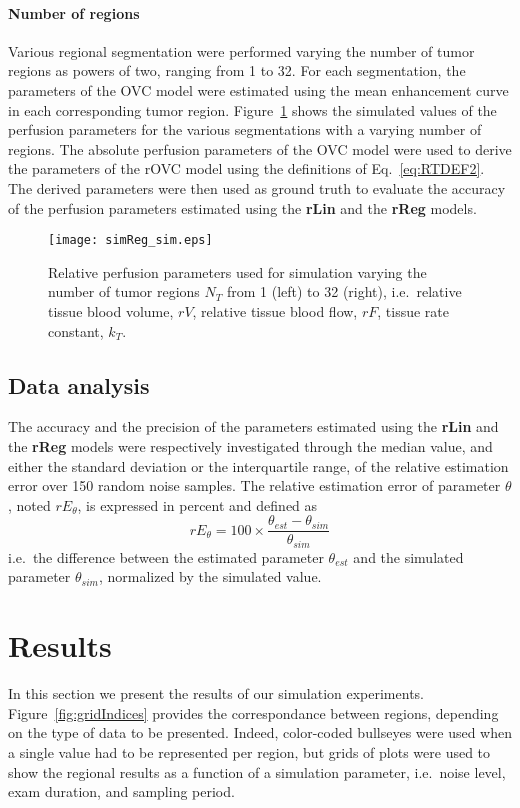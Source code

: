 \paragraph{Number of regions}
Various regional segmentation were performed varying the number of tumor regions as powers of two, ranging from 1 to 32.
For each segmentation, the parameters of the OVC model were estimated using the mean enhancement curve in each corresponding tumor region.
Figure~\ref{fig:simReg} shows the simulated values of the perfusion parameters for the various segmentations with a varying number of regions. 
The absolute perfusion parameters of the OVC model were used to derive the parameters of the rOVC model using the definitions of Eq.~\ref{eq:RTDEF2}.
The derived parameters were then used as ground truth to evaluate the accuracy of the perfusion parameters estimated using the \textbf{rLin} and the \textbf{rReg} models.

\begin{figure}
\texttt{[image: simReg\_sim.eps]}
\caption{Relative perfusion parameters used for simulation varying the number of tumor regions $N_T$ from 1 (left) to 32 (right), i.e.~relative tissue blood volume, $rV$, relative tissue blood flow, $rF$, tissue rate constant, $k_T$.}
\label{fig:simReg}
\end{figure}

\subsection{Data analysis}\label{sec:dataAnalysis}
The accuracy and the precision of the parameters estimated using the \textbf{rLin} and the \textbf{rReg} models were respectively investigated through the median value, and either the standard deviation or the interquartile range, of the relative estimation error over 150 random noise samples.
The relative estimation error of parameter $\theta$, noted $rE_{\theta}$, is expressed in percent and defined as
\begin{equation}
rE_{\theta} = 100 \times \frac{\theta_{est}-\theta_{sim}}{\theta_{sim}}
\end{equation}
i.e.~the difference between the estimated parameter $\theta_{est}$ and the simulated parameter $\theta_{sim}$, normalized by the simulated value.
\FloatBarrier

\section{Results}
In this section we present the results of our simulation experiments.
Figure~\ref{fig:gridIndices} provides the correspondance between regions, depending on the type of data to be presented.
Indeed, color-coded bullseyes were used when a single value had to be represented per region, but grids of plots were used to show the regional results as a function of a simulation parameter, i.e.~noise level, exam duration, and sampling period.

